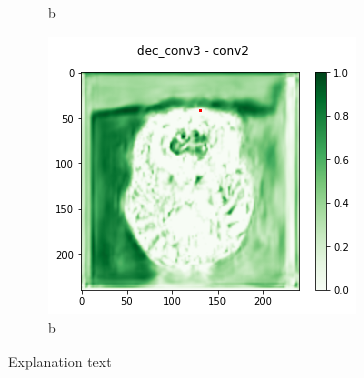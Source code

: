 \begin{figure}[H]
\begin{subfigure}{.33\textwidth}
        \caption{b}
    \end{subfigure}
        \begin{subfigure}{.33\textwidth}
        \centering
        \includegraphics[width=\linewidth]{chapters/04_segmentation/images/grad_cam_29.png}
        \caption{b}
    \end{subfigure}
    \caption{Explanation text}
\end{figure}


